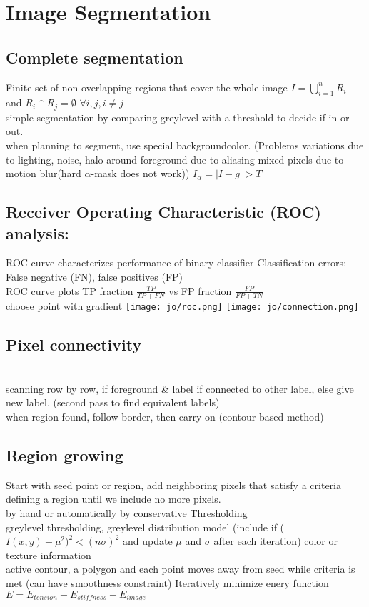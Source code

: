 \section{Image Segmentation}
\subsection*{Complete segmentation}
Finite set of non-overlapping regions that cover the whole image $I = \bigcup_{i = 1}^{n} R_i$ and $R_i \cap R_j = \emptyset$ $\forall i, j, i \neq j$\\
 simple segmentation by comparing greylevel with a threshold to decide if in or out.\\
 when planning to segment, use special backgroundcolor. (Problems variations due to lighting, noise, halo around foreground due to aliasing mixed pixels due to motion blur(hard $\alpha$-mask does not work)) $I_\alpha = |I - g| > T$
\subsection*{Receiver Operating Characteristic (ROC) analysis:}
ROC curve characterizes performance of binary classifier Classification errors: False negative (FN), false positives (FP)\\
ROC curve plots TP fraction $\frac{TP}{TP + FN}$ vs FP fraction $\frac{FP}{FP + TN}$\\
 choose point with gradient
\texttt{[image: jo/roc.png]} \texttt{[image: jo/connection.png]}
\subsection*{Pixel connectivity}
\\
 scanning row by row, if foreground \& label if connected to other label, else give new label. (second pass to find equivalent labels)\\
 when region found, follow border, then carry on (contour-based method)
\subsection*{Region growing}
Start with seed point or region, add neighboring pixels that satisfy a criteria defining a region until we include no more pixels.\\
 by hand or automatically by conservative Thresholding\\
 greylevel thresholding, greylevel distribution model (include if ($I(x, y) - \mu^{2})^{2} < (n \sigma)^{2}$ and update $\mu$ and $\sigma$ after each iteration) color or texture information\\
 active contour, a polygon and each point moves away from seed while criteria is met (can have smoothness constraint) Iteratively minimize enery function $E = E_{tension} + E_{stiffness} + E_{image}$
